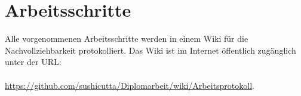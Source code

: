   \section{Arbeitsschritte}
  
  Alle vorgenommenen Arbeitsschritte werden in einem Wiki für die
  Nachvollziehbarkeit protokolliert. Das Wiki ist im Internet öffentlich
  zugänglich unter der \ac{URL}:\\
  \\
  \url{https://github.com/sushicutta/Diplomarbeit/wiki/Arbeitsprotokoll}.